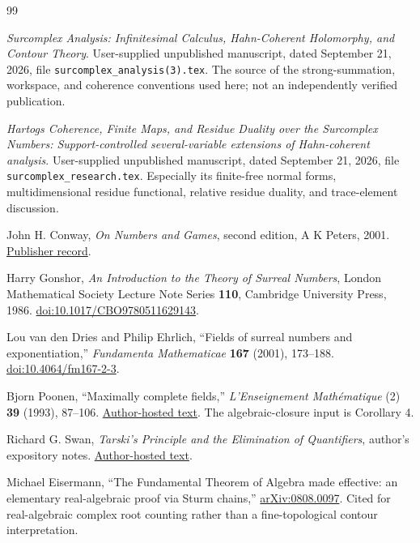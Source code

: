 \documentclass[11pt,letterpaper,oneside]{article}
\numberwithin{equation}{section}
\theoremstyle{definition}
\theoremstyle{remark}\newtheorem{remark}[theorem]{Remark}
\begin{document}
\clearpage
\begin{thebibliography}{99}
\small
{}

\emph{Surcomplex Analysis: Infinitesimal Calculus, Hahn-Coherent
Holomorphy, and Contour Theory}.
User-supplied unpublished manuscript, dated September 21, 2026,
file \texttt{surcomplex\_analysis(3).tex}.
The source of the strong-summation, workspace, and coherence conventions
used here; not an independently verified publication.

\emph{Hartogs Coherence, Finite Maps, and Residue Duality over the
Surcomplex Numbers: Support-controlled several-variable extensions of
Hahn-coherent analysis}.
User-supplied unpublished manuscript, dated September 21, 2026,
file \texttt{surcomplex\_research.tex}.
Especially its finite-free normal forms, multidimensional residue
functional, relative residue duality, and trace-element discussion.

John H. Conway, \emph{On Numbers and Games}, second edition,
A K Peters, 2001.
\href{https://www.routledge.com/On-Numbers-and-Games/Conway/p/book/9781568811277}{Publisher record}.

Harry Gonshor, \emph{An Introduction to the Theory of Surreal Numbers},
London Mathematical Society Lecture Note Series \textbf{110},
Cambridge University Press, 1986.
\href{https://doi.org/10.1017/CBO9780511629143}{doi:10.1017/CBO9780511629143}.

Lou van den Dries and Philip Ehrlich,
``Fields of surreal numbers and exponentiation,''
\emph{Fundamenta Mathematicae} \textbf{167} (2001), 173--188.
\href{https://doi.org/10.4064/fm167-2-3}{doi:10.4064/fm167-2-3}.

Bjorn Poonen, ``Maximally complete fields,''
\emph{L'Enseignement Math\'ematique} (2) \textbf{39} (1993), 87--106.
\href{https://math.mit.edu/~poonen/papers/amsval.pdf}{Author-hosted text}.
The algebraic-closure input is Corollary 4.

Richard G. Swan, \emph{Tarski's Principle and the Elimination of Quantifiers},
author's expository notes.
\href{https://www.math.uchicago.edu/~swan/expo/Tarski.pdf}{Author-hosted text}.

Michael Eisermann,
``The Fundamental Theorem of Algebra made effective: an elementary
real-algebraic proof via Sturm chains,''
\href{https://arxiv.org/abs/0808.0097}{arXiv:0808.0097}.
Cited for real-algebraic complex root counting rather than a fine-topological
contour interpretation.


\end{thebibliography}
\end{document}
